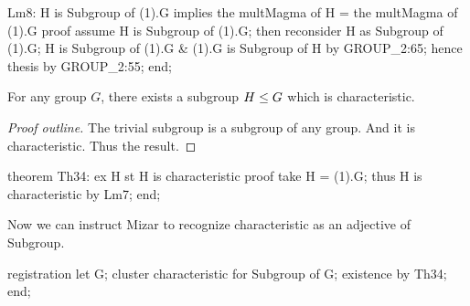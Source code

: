 \nwenddocs{}\endmoddef\nwstartdeflinemarkup{}\nwenddeflinemarkup
Lm8: H is Subgroup of (1).G implies the multMagma of H = the multMagma of (1).G
proof
  assume H is Subgroup of (1).G;
  then reconsider H as Subgroup of (1).G;
  H is Subgroup of (1).G & (1).G is Subgroup of H by GROUP_2:65;
  hence thesis by GROUP_2:55;
end;
\eatline
{}\nwendcode{}\nwdocspar
\begin{theorem}
For any group $G$, there exists a subgroup $H\leq G$ which is characteristic.
\end{theorem}
\begin{proof}[Proof outline]
The trivial subgroup is a subgroup of any group. And it is
characteristic. Thus the result.
\end{proof}

\nwenddocs{}\endmoddef\nwstartdeflinemarkup{}\nwenddeflinemarkup

theorem Th34:
  ex H st H is characteristic
proof
  take H = (1).G;
  thus H is characteristic by Lm7;
end;
\eatline
{}\nwendcode{}\nwdocspar
\begin{registration}
Now we can instruct Mizar to recognize {\Tt{}characteristic\nwendquote} as an
adjective of {\Tt{}Subgroup\nwendquote}.
\end{registration}

\nwenddocs{}\endmoddef\nwstartdeflinemarkup{}\nwenddeflinemarkup
registration
  let G;
  cluster characteristic for Subgroup of G;
  existence by Th34;
end;
\nwendcode{}\nwdocspar

